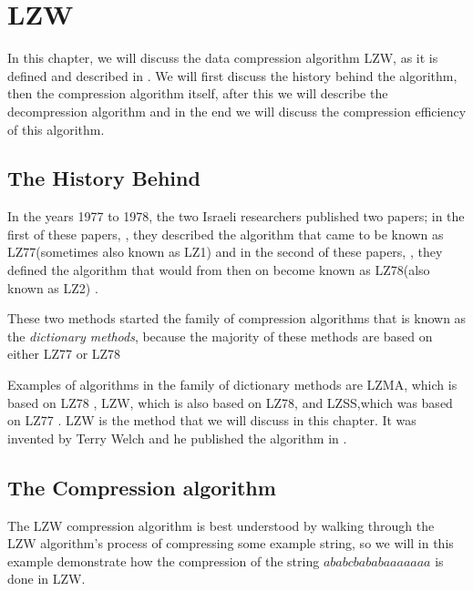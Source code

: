 \begin{comment}
  
\end{comment}

\chapter{LZW}
\label{cha:lzw}

In this chapter, we will discuss the data compression algorithm LZW,
as it is defined and described in
\cite{Nelson:1989:LDC:77102.77104,Welch:1984:THD:1319729.1320134,Salomon:2004:DCC,mark1996data_compression_book,nelson:_lzw_revis}. We
will first discuss the history behind the algorithm, then the
compression algorithm itself, after this we will describe the
decompression algorithm and in the end we will discuss the compression
efficiency of this algorithm.

\section{The History Behind}

In the years 1977 to 1978, the two Israeli researchers published two
papers; in the first of these papers, \cite{Ziv77auniversal}, they
described the algorithm that came to be known as LZ77(sometimes also
known as LZ1) and in the second of these papers,
\cite{Ziv78compressionof}, they defined the algorithm that would from
then on become known as LZ78(also known as LZ2)
\cite{roelofs09:_histor_portab_networ_graph_png_format,Salomon:2004:DCC,winters:_us_paten_adapt}.

These two methods started the family of compression algorithms that is
known as the \textit{dictionary methods},
because the majority of these methods are based on either LZ77 or
LZ78

Examples of algorithms in the family of dictionary methods are LZMA,
which is based on LZ78 \cite{palov11}, LZW, which is also based on
LZ78, and LZSS,which was based on LZ77 \cite{Salomon:2004:DCC}. LZW is
the method that we will discuss in this chapter. It was invented by
Terry Welch and he published the algorithm in \cite{welch85:_u}.

\section{The Compression algorithm}
\label{sec:lzw-comp-desc}

The LZW compression algorithm is best
understood by walking through the LZW algorithm's process of
compressing some example string, so we will in this example
demonstrate how the compression of the string
$ababcbababaaaaaaa$ is done in LZW.

